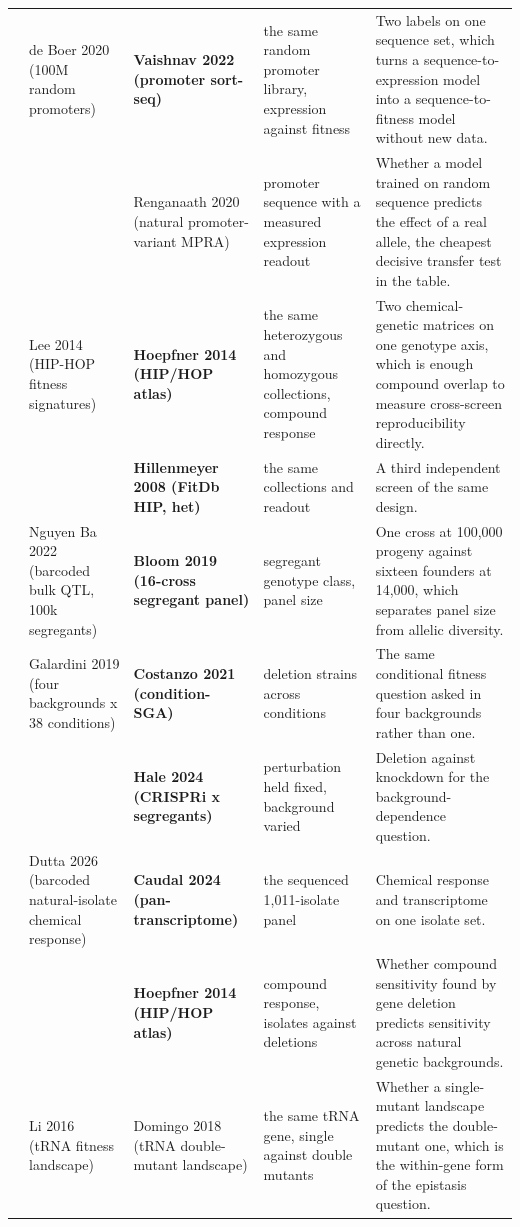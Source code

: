 \begin{landscape}
\begin{longtable}{@{}r@{\hspace{4pt}} L{42mm} L{44mm} L{48mm} L{96mm}@{}}
 & de Boer 2020 (100M random promoters) & \textbf{Vaishnav 2022 (promoter sort-seq)} & the same random promoter library, expression against fitness & Two labels on one sequence set, which turns a sequence-to-expression model into a sequence-to-fitness model without new data. \\
 &  & Renganaath 2020 (natural promoter-variant MPRA) & promoter sequence with a measured expression readout & Whether a model trained on random sequence predicts the effect of a real allele, the cheapest decisive transfer test in the table. \\
 & Lee 2014 (HIP-HOP fitness signatures) & \textbf{Hoepfner 2014 (HIP/HOP atlas)} & the same heterozygous and homozygous collections, compound response & Two chemical-genetic matrices on one genotype axis, which is enough compound overlap to measure cross-screen reproducibility directly. \\
 &  & \textbf{Hillenmeyer 2008 (FitDb HIP, het)} & the same collections and readout & A third independent screen of the same design. \\
 & Nguyen Ba 2022 (barcoded bulk QTL, 100k segregants) & \textbf{Bloom 2019 (16-cross segregant panel)} & segregant genotype class, panel size & One cross at 100,000 progeny against sixteen founders at 14,000, which separates panel size from allelic diversity. \\
 & Galardini 2019 (four backgrounds x 38 conditions) & \textbf{Costanzo 2021 (condition-SGA)} & deletion strains across conditions & The same conditional fitness question asked in four backgrounds rather than one. \\
 &  & \textbf{Hale 2024 (CRISPRi x segregants)} & perturbation held fixed, background varied & Deletion against knockdown for the background-dependence question. \\
 & Dutta 2026 (barcoded natural-isolate chemical response) & \textbf{Caudal 2024 (pan-transcriptome)} & the sequenced 1,011-isolate panel & Chemical response and transcriptome on one isolate set. \\
 &  & \textbf{Hoepfner 2014 (HIP/HOP atlas)} & compound response, isolates against deletions & Whether compound sensitivity found by gene deletion predicts sensitivity across natural genetic backgrounds. \\
 & Li 2016 (tRNA fitness landscape) & Domingo 2018 (tRNA double-mutant landscape) & the same tRNA gene, single against double mutants & Whether a single-mutant landscape predicts the double-mutant one, which is the within-gene form of the epistasis question. \\

\end{longtable}
\end{landscape}
